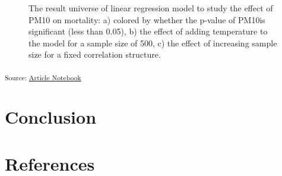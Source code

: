 \documentclass[
]{jds}
\begin{document}
\label{cell-fig-result-universe}
\begin{figure}[H]


\caption{\label{fig-result-universe}The result universe of linear
regression model to study the effect of PM10 on mortality: a) colored by
whether the p-value of PM10is significant (less than 0.05), b) the
effect of adding temperature to the model for a sample size of 500, c)
the effect of increasing sample size for a fixed correlation structure.}

\end{figure}%

\textsubscript{Source:
\href{https://huizezhang-sherry.github.io/paper-analysis-plan/index.qmd.html}{Article
Notebook}}

\section{Conclusion}\label{sec-conclusion}

\section{References}\label{references}
\end{document}
